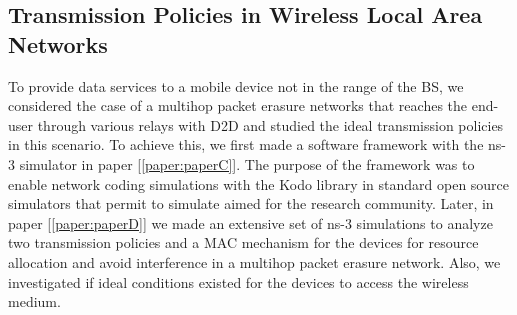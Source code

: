 \subsection{Transmission Policies in Wireless Local Area Networks}

To provide data services to a mobile device not in the range of the \ac{BS}, we considered the case of a multihop packet erasure networks that reaches the end-user through various relays with \ac{D2D} and studied the ideal transmission policies in this scenario. To achieve this, we first made a software framework with the ns-3 simulator in paper {[\ref{paper:paperC}]}. The purpose of the framework was to enable network coding simulations with the Kodo library in standard open source simulators that permit to simulate aimed for the research community. Later, in paper {[\ref{paper:paperD}]} we made an extensive set of ns-3 simulations to analyze two transmission policies and a \ac{MAC} mechanism for the devices for resource allocation and avoid interference in a multihop packet erasure network. Also, we investigated if ideal conditions existed for the devices to access the wireless medium.